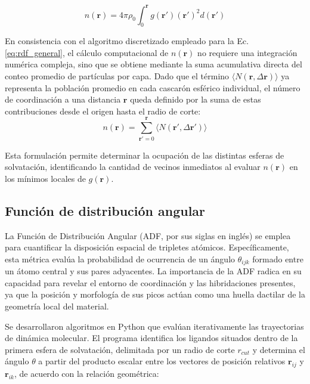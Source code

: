 \begin{equation}
    n(\mathbf{r}) = 4\pi \rho_0 \int_0^{\mathbf{r}} g(\mathbf{r}') (\mathbf{r}')^2 d(\mathbf{r}')
    \label{eq:cn_integral}
\end{equation}

En consistencia con el algoritmo discretizado empleado para la Ec. \ref{eq:rdf_general}, el cálculo computacional de $n(\mathbf{r})$ no requiere una integración numérica compleja, sino que se obtiene mediante la suma acumulativa directa del conteo promedio de partículas por capa. Dado que el término $\langle N(\mathbf{r}, \Delta \mathbf{r}) \rangle$ ya representa la población promedio en cada cascarón esférico individual, el número de coordinación a una distancia $\mathbf{r}$ queda definido por la suma de estas contribuciones desde el origen hasta el radio de corte:
\begin{equation}
    n(\mathbf{r}) = \sum_{\mathbf{r}'=0}^{\mathbf{r}} \langle N(\mathbf{r}', \Delta \mathbf{r}') \rangle
    \label{eq:cn_discreto}
\end{equation}

Esta formulación permite determinar la ocupación de las distintas esferas de solvatación, identificando la cantidad de vecinos inmediatos al evaluar $n(\mathbf{r})$ en los mínimos locales de $g(\mathbf{r})$.

\subsection{Función de distribución angular}

La Función de Distribución Angular (ADF, por sus siglas en inglés) se emplea para cuantificar la disposición espacial de tripletes atómicos. Específicamente, esta métrica evalúa la probabilidad de ocurrencia de un ángulo $\theta_{ijk}$ formado entre un átomo central y sus pares adyacentes. La importancia de la ADF radica en su capacidad para revelar el entorno de coordinación y las hibridaciones presentes, ya que la posición y morfología de sus picos actúan como una huella dactilar de la geometría local del material. 

Se desarrollaron algoritmos en Python que evalúan iterativamente las trayectorias de dinámica molecular. El programa identifica los ligandos situados dentro de la primera esfera de solvatación, delimitada por un radio de corte $r_{cut}$  y determina el ángulo $\theta$ a partir del producto escalar entre los vectores de posición relativos $\mathbf{r}_{ij}$ y $\mathbf{r}_{ik}$, de acuerdo con la relación geométrica:

